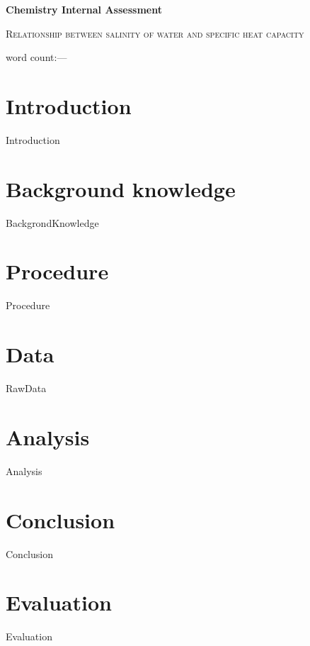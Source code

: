 \documentclass[12pt,a4paper]{article}
\begin{document}
\begin{titlepage}
	\centering
	{\huge\bfseries Chemistry Internal Assessment\par}
	\vspace{1cm}
	{\scshape\Large Relationship between salinity of water and specific heat capacity\par}
	{word count:---}
\end{titlepage}

\tableofcontents

\section{Introduction}
{Introduction}

\section{Background knowledge}
{BackgrondKnowledge}

\section{Procedure}
{Procedure}

\section{Data}
{RawData}

\section{Analysis}
{Analysis}

\section{Conclusion}
{Conclusion}

\section{Evaluation}
{Evaluation}


\end{document}
